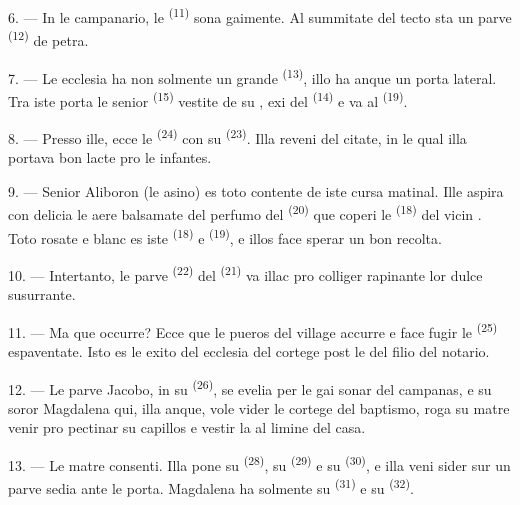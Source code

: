 6. --- In le campanario, le  \textsuperscript{(11)} sona
gaimente. Al summitate del tecto sta un parve 
\textsuperscript{(12)} de petra.

7. --- Le ecclesia ha non solmente un grande 
\textsuperscript{(13)}, illo ha anque un porta lateral. Tra iste porta le senior
 \textsuperscript{(15)} vestite de su , exi del
 \textsuperscript{(14)} e va al 
\textsuperscript{(19)}.

8. --- Presso ille, ecce le  \textsuperscript{(24)} con su
 \textsuperscript{(23)}. Illa reveni del citate, in le qual illa
portava bon lacte pro le infantes.

\VUsaut{4.0mm}
\VUsaut{3.4mm}

9. --- Senior Aliboron (le asino) es toto contente de iste cursa matinal. Ille
aspira con delicia le aere balsamate del perfumo del 
\textsuperscript{(20)} que coperi le 
\textsuperscript{(18)} del vicin . Toto rosate e blanc es iste
 \textsuperscript{(18)} e 
\textsuperscript{(19)}, e illos face sperar un bon recolta.

10. --- Intertanto, le parve  \textsuperscript{(22)} del
 \textsuperscript{(21)} va illac pro colliger rapinante lor dulce
 susurrante.

11. --- Ma que occurre? Ecce que le pueros del village accurre e face fugir le
 \textsuperscript{(25)} espaventate. Isto es le exito del
ecclesia del cortege post le  del filio del notario.

12. --- Le parve Jacobo, in su  \textsuperscript{(26)}, se evelia
per le gai sonar del campanas, e su soror Magdalena qui, illa anque, vole vider
le cortege del baptismo, roga su matre venir pro pectinar su capillos e vestir
la al limine del casa.

13. --- Le matre consenti. Illa pone su  \textsuperscript{(28)},
su  \textsuperscript{(29)} e su 
\textsuperscript{(30)}, e illa veni sider sur un parve sedia ante le porta.
Magdalena ha solmente su  \textsuperscript{(31)} e su
 \textsuperscript{(32)}.

